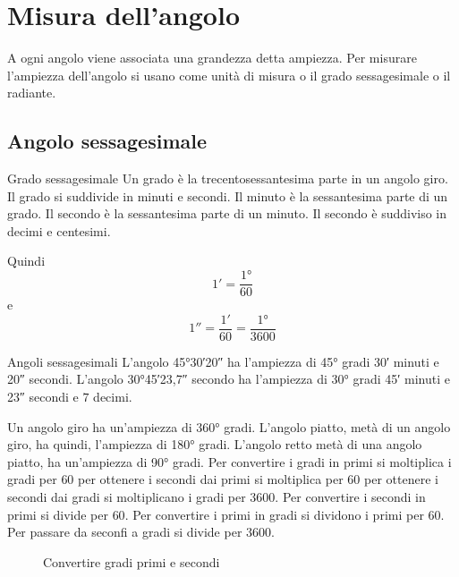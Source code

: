 \section{Misura dell'angolo}
\label{sec:MisuraAngoloGonio}

A ogni angolo viene associata una grandezza detta ampiezza. Per misurare l'ampiezza dell'angolo si usano come unità di misura o il grado sessagesimale o il radiante.
\subsection{Angolo sessagesimale}
\begin{definizionet}{Grado sessagesimale}{}
Un grado è la trecentosessantesima parte in un angolo giro. Il grado si suddivide in minuti e secondi. Il minuto è la sessantesima parte di un grado. Il secondo è la sessantesima parte di un minuto. Il secondo è suddiviso in decimi e centesimi.
\end{definizionet}
 Quindi \[\ang{;1;}=\dfrac{\ang{1}}{60}\] e \[\ang{;;1}=\dfrac{\ang{;1;}}{60}=\dfrac{\ang{1}}{3600}\]
\begin{esempiot}{Angoli sessagesimali}{}
L'angolo \ang{45;30;20} ha l'ampiezza di \ang{45} gradi \ang{;30;} minuti e \ang{;;20} secondi. L'angolo \ang{30;45;23,7} secondo ha l'ampiezza di \ang{30} gradi \ang{;45;} minuti e \ang{;;23} secondi e $7$ decimi.
\end{esempiot}
Un angolo giro ha un'ampiezza di \ang{360} gradi. L'angolo piatto, metà di un angolo giro, ha quindi, l'ampiezza di \ang{180} gradi. L'angolo retto metà di una angolo piatto, ha un'ampiezza di \ang{90} gradi. Per convertire i gradi in primi si moltiplica i gradi  per $\num{60}$ per ottenere i secondi dai primi si moltiplica per  $\num{60}$ per ottenere i secondi dai gradi si moltiplicano i gradi per  $\num{3600}$. Per convertire i secondi in primi si divide per  $\num{60}$. Per convertire i primi in gradi si dividono i primi per  $\num{60}$. Per passare da seconfi a gradi si divide per  $\num{3600}$.
\begin{figure} %
	\centering
	
	\caption{Convertire gradi primi e secondi}\label{fig:Convertiregradiprimisecondi}
\end{figure}
